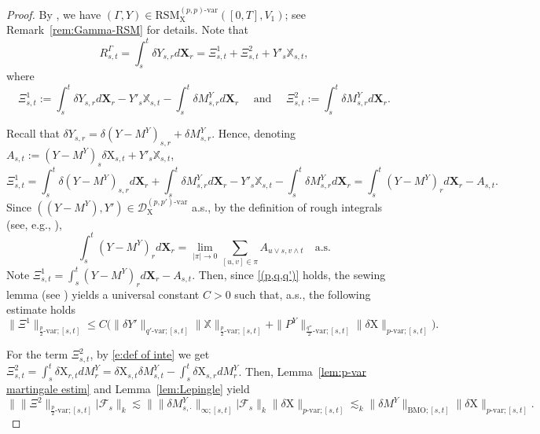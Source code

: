 \documentclass[11pt,reqno]{amsart}
\numberwithin{equation}{section}
\begin{document}
\begin{proof} 
By \cite{friz2023rough}, we have $(\Gamma,Y) \in \mathrm{RSM}^{(p,p)\text{-}\mathrm{var}}_{\mathrm X}([0,T],V_1)$; see Remark~\ref{rem:Gamma-RSM} for details. Note that 
\begin{equation}\label{e:R^Gamma = Xi^1 + Xi^2}
R^{\Gamma}_{s,t} = \int_{s}^{t}\delta Y_{s,r} d\mathbf X_r=\Xi^1_{s,t} + \Xi^2_{s,t} + Y'_{s}\mathbb X_{s,t},
\end{equation}
where 
\begin{equation*}
\Xi^1_{s,t} := \int_{s}^{t}\delta Y_{s,r} d\mathbf X_r - Y'_{s} \mathbb X_{s,t} - \int_{s}^{t}\delta M^{Y}_{s,r}d\mathbf X_{r}\quad \text{ and }\quad \Xi^2_{s,t} := \int_{s}^{t}\delta M^{Y}_{s,r} d\mathbf X_{r}.
\end{equation*}

Recall that $\delta Y_{s,r} = \delta (Y - M^Y)_{s,r} + \delta M^{Y}_{s,r}$. Hence, denoting $A_{s,t} := (Y - M^Y)_{s}\delta\mathrm X_{s,t} + Y'_{s}\mathbb X_{s,t}$, 
\begin{equation*}
\Xi^1_{s,t} = \int_{s}^{t}\delta (Y - M^Y)_{s,r} d\mathbf X_r + \int_{s}^{t}\delta M^{Y}_{s,r} d\mathbf X_{r} - Y'_{s}\mathbb X_{s,t} - \int_{s}^{t}\delta M^{Y}_{s,r} d\mathbf X_{r} = \int_s^t (Y - M^Y)_{r} d\mathbf X_r - A_{s,t}.
\end{equation*}
Since $((Y - M^Y),Y')\in\mathscr{D}^{(p,p')\text{-}\mathrm{var}}_{\mathrm X}$ a.s., by the definition of rough integrals (see, e.g., \cite{friz2020course,FrizZhang-2018}), 
\begin{equation*}
\int_s^t (Y - M^Y)_{r} d\mathbf X_r = \lim_{|\pi|\to 0}\sum_{[u,v]\in\pi} A_{u\vee s,v\land t}\quad \text{a.s.}
\end{equation*}
Note $\Xi^{1}_{s,t} = \int_{s}^{t} (Y - M^Y)_{r}d\mathbf X_{r} - A_{s,t}$. Then, since \ref{(p,q,q')} holds, the sewing lemma (see \cite[Theorem~2.5]{FrizZhang-2018}) yields a universal constant $C>0$ such that, a.s., the following estimate holds 
\begin{equation}\label{e:Xi <= Y X + R^Y X}
\|\Xi^1\|_{\frac{p}{2}\text{-}\mathrm{var};[s,t]} \le C \Big( \|\delta Y'\|_{q'\text{-}\mathrm{var};[s,t]} \|\mathbb X\|_{\frac{p}{2}\text{-var};[s,t]} +  \|P^{Y}\|_{\frac{q''}{2}\text{-var};[s,t]}\|\delta \mathrm X\|_{p\text{-var};[s,t]} \Big).
\end{equation}

For the term $\Xi^{2}_{s,t}$, by \eqref{e:def of inte} we get $\Xi^{2}_{s,t} = \int_{s}^{t}\delta \mathrm X_{r,t} dM^{Y}_{r} = \delta \mathrm X_{s,t}\delta M^{Y}_{s,t} - \int_{s}^{t}\delta \mathrm X_{s,r} dM^{Y}_{r}$. 
Then, Lemma~\ref{lem:p-var martingale estim} and Lemma~\ref{lem:Lepingle} yield 
\begin{equation}\label{e:A <= M X}
\big\|\|\Xi^{2}\|_{\frac{p}{2}\text{-var};[s,t]}\big|\mathcal F_{s}\big\|_{k} \lesssim \big\| \|\delta M^{Y}_{s,\cdot}\|_{\infty;[s,t]} \big|\mathcal F_{s}\big\|_{k} \|\delta \mathrm X\|_{p\text{-}\mathrm{var};[s,t]}  \lesssim_k  \|\delta M^{Y}\|_{\mathrm{BMO};[s,t]}\|\delta \mathrm X\|_{p\text{-var};[s,t]}.
\end{equation}


\end{proof}
\end{document}
